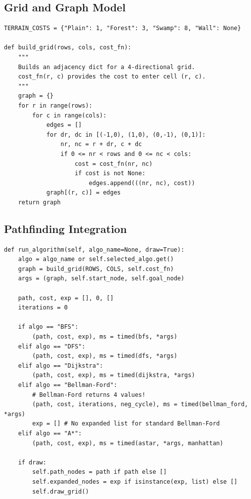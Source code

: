 \documentclass[12pt, a4paper, oneside]{report}
\theoremstyle{definition}
\begin{document}
\subsection{Grid and Graph Model}

\begin{lstlisting}[caption={Terrain costs and grid-to-graph conversion (from core.utils)}, label={lst:gridmodel}]
TERRAIN_COSTS = {"Plain": 1, "Forest": 3, "Swamp": 8, "Wall": None}

def build_grid(rows, cols, cost_fn):
    """
    Builds an adjacency dict for a 4-directional grid.
    cost_fn(r, c) provides the cost to enter cell (r, c).
    """
    graph = {}
    for r in range(rows):
        for c in range(cols):
            edges = []
            for dr, dc in [(-1,0), (1,0), (0,-1), (0,1)]:
                nr, nc = r + dr, c + dc
                if 0 <= nr < rows and 0 <= nc < cols:
                    cost = cost_fn(nr, nc)
                    if cost is not None:
                        edges.append(((nr, nc), cost))
            graph[(r, c)] = edges
    return graph
\end{lstlisting}

\subsection{Pathfinding Integration}

\begin{lstlisting}[caption={Unified algorithm integration in the simulator (from case\_study\_1\_game/simulator.py)}, label={lst:griddijkstra}]
def run_algorithm(self, algo_name=None, draw=True):
    algo = algo_name or self.selected_algo.get()
    graph = build_grid(ROWS, COLS, self.cost_fn)
    args = (graph, self.start_node, self.goal_node)
    
    path, cost, exp = [], 0, []
    iterations = 0
    
    if algo == "BFS":
        (path, cost, exp), ms = timed(bfs, *args)
    elif algo == "DFS":
        (path, cost, exp), ms = timed(dfs, *args)
    elif algo == "Dijkstra":
        (path, cost, exp), ms = timed(dijkstra, *args)
    elif algo == "Bellman-Ford":
        # Bellman-Ford returns 4 values!
        (path, cost, iterations, neg_cycle), ms = timed(bellman_ford, *args)
        exp = [] # No expanded list for standard Bellman-Ford
    elif algo == "A*":
        (path, cost, exp), ms = timed(astar, *args, manhattan)

    if draw:
        self.path_nodes = path if path else []
        self.expanded_nodes = exp if isinstance(exp, list) else []
        self.draw_grid()
\end{lstlisting}
\end{document}

